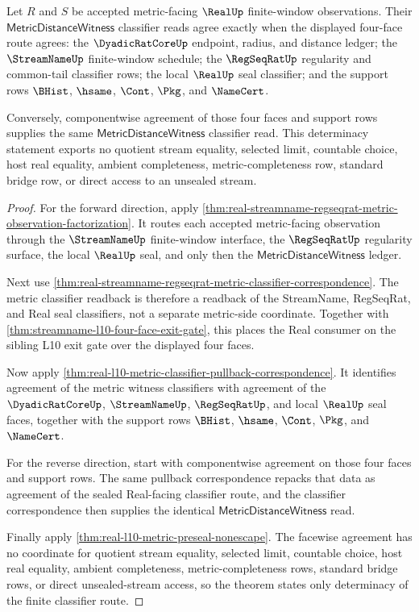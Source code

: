 \begin{theorem}
\label{thm:real-l10-metric-witness-facewise-determinacy}
Let $R$ and $S$ be accepted metric-facing $\RealUp$ finite-window observations.
Their $\mathsf{MetricDistanceWitness}$ classifier reads agree exactly when the
displayed four-face route agrees: the $\DyadicRatCoreUp$ endpoint, radius, and
distance ledger; the $\StreamNameUp$ finite-window schedule; the $\RegSeqRatUp$
regularity and common-tail classifier rows; the local $\RealUp$ seal classifier;
and the support rows $\BHist$, $\hsame$, $\Cont$, $\Pkg$, and $\NameCert$.

Conversely, componentwise agreement of those four faces and support rows
supplies the same $\mathsf{MetricDistanceWitness}$ classifier read. This
determinacy statement exports no quotient stream equality, selected limit,
countable choice, host real equality, ambient completeness,
metric-completeness row, standard bridge row, or direct access to an unsealed
stream.
\end{theorem}
\begin{proof}
For the forward direction, apply
\autoref{thm:real-streamname-regseqrat-metric-observation-factorization}. It
routes each accepted metric-facing observation through the $\StreamNameUp$
finite-window interface, the $\RegSeqRatUp$ regularity surface, the local
$\RealUp$ seal, and only then the $\mathsf{MetricDistanceWitness}$ ledger.

Next use
\autoref{thm:real-streamname-regseqrat-metric-classifier-correspondence}. The
metric classifier readback is therefore a readback of the StreamName,
RegSeqRat, and Real seal classifiers, not a separate metric-side coordinate.
Together with \autoref{thm:streamname-l10-four-face-exit-gate}, this places the
Real consumer on the sibling L10 exit gate over the displayed four faces.

Now apply
\autoref{thm:real-l10-metric-classifier-pullback-correspondence}. It identifies
agreement of the metric witness classifiers with agreement of the
$\DyadicRatCoreUp$, $\StreamNameUp$, $\RegSeqRatUp$, and local $\RealUp$ seal
faces, together with the support rows $\BHist$, $\hsame$, $\Cont$, $\Pkg$, and
$\NameCert$.

For the reverse direction, start with componentwise agreement on those four
faces and support rows. The same pullback correspondence repacks that data as
agreement of the sealed Real-facing classifier route, and the classifier
correspondence then supplies the identical
$\mathsf{MetricDistanceWitness}$ read.

Finally apply \autoref{thm:real-l10-metric-preseal-nonescape}. The facewise
agreement has no coordinate for quotient stream equality, selected limit,
countable choice, host real equality, ambient completeness, metric-completeness
rows, standard bridge rows, or direct unsealed-stream access, so the theorem
states only determinacy of the finite classifier route.
\end{proof}

